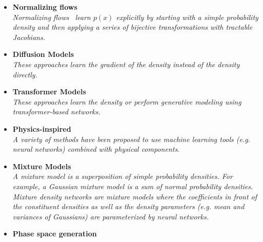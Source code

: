 \documentclass[12pt,letterpaper]{article}
\begin{document}
\begin{itemize}
\begin{itemize}
		\item \textbf{Normalizing flows}~\cite{Albergo:2019eim,1800956,Kanwar:2003.06413,Brehmer:2020vwc,Bothmann:2020ywa,Gao:2020zvv,Gao:2020vdv,Nachman:2020lpy,Choi:2020bnf,Lu:2020npg,Bieringer:2020tnw,Hollingsworth:2021sii,Winterhalder:2021ave,Krause:2021ilc,Hackett:2021idh,Menary:2021tjg,Hallin:2021wme,NEURIPS2020_a878dbeb,Vandegar:2020yvw,Jawahar:2021vyu,Bister:2021arb,Krause:2021wez,Butter:2021csz,Winterhalder:2021ngy,Butter:2022lkf,Verheyen:2022tov,Leigh:2022lpn,Chen:2022ytr,Albandea:2022fky,Krause:2022jna,Cresswell:2022tof,Kach:2022qnf,Kach:2022uzq,Dolan:2022ikg,Backes:2022vmn,Heimel:2022wyj,Albandea:2023wgd,Rousselot:2023pcj,Diefenbacher:2023vsw,Nicoli:2023qsl,R:2023dcr,Nachman:2023clf,Raine:2023fko,Golling:2023yjq}
		\\\textit{Normalizing flows~\cite{pmlr-v37-rezende15} learn $p(x)$ explicitly by starting with a simple probability density and then applying a series of bijective transformations with tractable Jacobians.}
		\item \textbf{Diffusion Models}~\cite{Mikuni:2022xry,Leigh:2023toe,Mikuni:2023dvk,Shmakov:2023kjj,Buhmann:2023bwk,Butter:2023fov,Mikuni:2023tok,Acosta:2023zik,Imani:2023blb,Amram:2023onf}
		\\\textit{These approaches learn the gradient of the density instead of the density directly.}
		\item \textbf{Transformer Models}~\cite{Finke:2023veq,Butter:2023fov,Raine:2023fko}
		\\\textit{These approaches learn the density or perform generative modeling using transformer-based networks.}
		\item \textbf{Physics-inspired}~\cite{Andreassen:2018apy,Andreassen:2019txo,1808876,Lai:2020byl,Barenboim:2021vzh}
		\\\textit{A variety of methods have been proposed to use machine learning tools (e.g. neural networks) combined with physical components.}
		\item \textbf{Mixture Models}~\cite{Chen:2020uds,Burton:2021tsd,Graziani:2021vai,Liu:2022dem}
		\\\textit{A mixture model is a superposition of simple probability densities.  For example, a Gaussian mixture model is a sum of normal probability densities.  Mixture density networks are mixture models where the coefficients in front of the constituent densities as well as the density parameters (e.g. mean and variances of Gaussians) are parameterized by neural networks.}
		\item \textbf{Phase space generation}~\cite{Bendavid:2017zhk,Bothmann:2020ywa,Gao:2020zvv,Gao:2020vdv,Klimek:2018mza,Carrazza:2020rdn,Nachman:2020fff,Chen:2020nfb,Verheyen:2020bjw,Backes:2020vka,Danziger:2021eeg,Yoon:2020zmb,Maitre:2022xle,Jinno:2022sbr,Heimel:2022wyj,Renteria-Estrada:2023buo,Singh:2023yvj}

\end{itemize}
\end{itemize}
\end{document}
